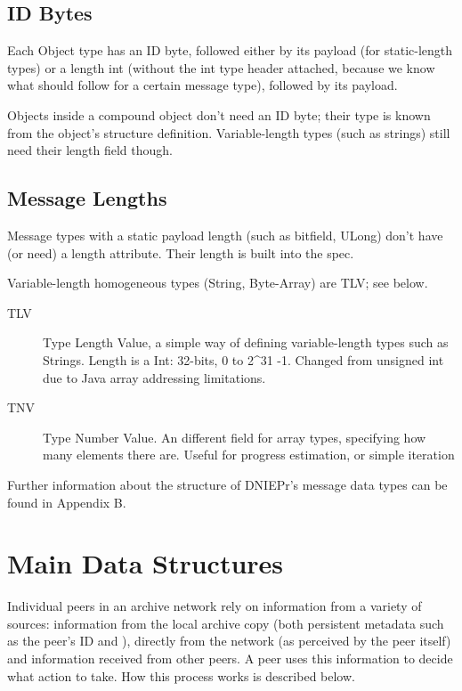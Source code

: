 \documentclass[12pt,a4paper,]{adreport}
\begin{document}
\subsection{ID Bytes}\label{id-bytes}

Each Object type has an ID byte, followed either by its payload (for
static-length types) or a length int (without the int type header
attached, because we know what should follow for a certain message
type), followed by its payload.

Objects inside a compound object don't need an ID byte; their type is
known from the object's structure definition. Variable-length types
(such as strings) still need their length field though.

\subsection{Message Lengths}\label{message-lengths}

Message types with a static payload length (such as bitfield, ULong)
don't have (or need) a length attribute. Their length is built into the
spec.

Variable-length homogeneous types (String, Byte-Array) are TLV; see
below.

\begin{description}
\item[TLV]
Type Length Value, a simple way of defining variable-length types such
as Strings. Length is a Int: 32-bits, 0 to 2\^{}31 -1. Changed from
unsigned int due to Java array addressing limitations.
\item[TNV]
Type Number Value. An different field for array types, specifying how
many elements there are. Useful for progress estimation, or simple
iteration
\end{description}

Further information about the structure of DNIEPr's message data types can be found in Appendix B.

\section{Main Data Structures}\label{main-data-structures}

Individual peers in an archive network rely on information from a
variety of sources: information from the local archive copy (both
persistent metadata such as the peer's ID and ), directly from the
network (as perceived by the peer itself) and information received from
other peers. A peer uses this information to decide what action to take.
How this process works is described below.
\end{document}
